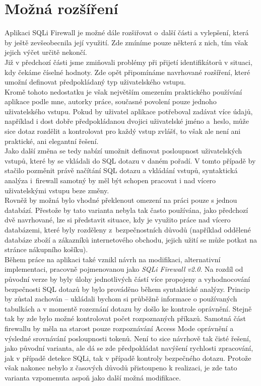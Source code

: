 \section{Možná rozšíření} \label{sec:7:rozsireni}
Aplikaci SQLi Firewall je možné dále rozšiřovat o~další části a vylepšení, která by ještě zevšeobecnila její využití. Zde zmíníme pouze
některá z nich, tím však jejich výčet určitě nekončí. \\

Již v předchozí části jsme zmiňovali problémy při přijetí identifikátorů v situaci, kdy čekáme číselné hodnoty. Zde opět připomínáme 
navrhované rozšíření, které umožní definovat předpokládaný typ uživatelského vstupu. \\

Kromě tohoto nedostatku je však největším omezením praktického používání aplikace podle mne, autorky práce, současné povolení pouze 
jednoho uživatelského vstupu. Pokud by uživatel aplikace potřeboval zadávat více údajů, například i dost dobře předpokládanou dvojici 
uživatelské jméno a~heslo, může sice dotaz rozdělit a kontrolovat pro každý vstup zvlášť, to však ale není ani praktické, ani elegantní 
řešení. \\

Jako další změna se tedy nabízí umožnit definovat posloupnost uživatelských vstupů, které by se vkládali do SQL dotazu v daném pořadí. 
V tomto případě by stačilo pozměnit právě načítání SQL dotazu a vkládání vstupů, syntaktická analýza i~firewall samotný by měl být schopen
pracovat i nad vícero uživatelskými vstupu beze změny. \\

Rovněž by možná bylo vhodné překlenout omezení na práci pouze s jednou databází. Přestože by tato varianta nebyla tak často používána, 
jako předchozí dvě navrhované, lze si představit situace, kdy je využito práce nad vícero databázemi, které byly rozděleny z~bezpečnostních důvodů
(například oddělené databáze zboží a zákazníků internetového obchodu, jejich užití se může potkat na stránce nákupního košíku). \\

Během práce na aplikaci také vznikl návrh na modifikaci, alternativní implementaci, pracovně pojmenovanou jako \textit{SQLi Firewall v2.0}. 
Na rozdíl od původní verze by byly úlohy jednotlivých částí více propojeny a vyhodnocování bezpečnosti SQL dotazů by bylo prováděno během 
syntaktické analýzy. Princip by zůstal zachován -- ukládali bychom si průběžně informace o používaných tabulkách a v momentě rozeznání dotazu 
by došlo ke kontrole oprávnění. Stejně tak by zde bylo možné kontrolovat počet rozpoznaných příkazů. Samotná část firewallu by měla na starost 
pouze rozpoznávání Access Mode oprávnění a výsledné srovnávání posloupnosti tokenů. Není to sice návrhově tak čisté řešení, jako původní varianta, 
ale dá se zde předpokládat navýšení rychlosti zpracování, jak v případě detekce SQLi, tak v případě kontroly bezpečného dotazu. Protože však nakonec
nebylo z časových důvodů přistoupeno k realizaci, je zde tato varianta vzpomenuta aspoň jako další možná modifikace.

